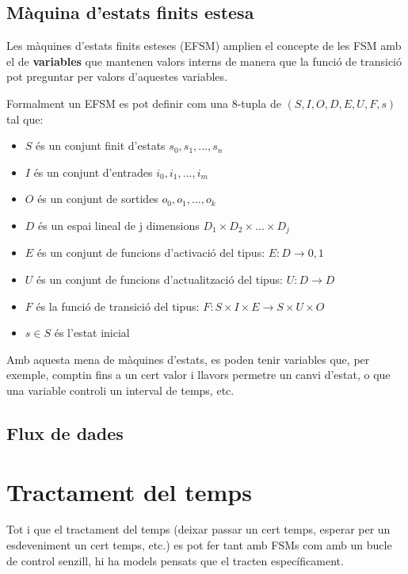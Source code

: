\section{Màquina d'estats finits estesa}
\label{sec:EFSM}

Les màquines d'estats finits esteses (\gls{EFSM}) amplien el concepte de les FSM amb el de {\bf variables} que mantenen valors interns de manera que la funció de transició pot preguntar per valors d'aquestes variables.\cite{wiki:EFSM}

\begin{remark}
 Formalment un EFSM es pot definir com una 8-tupla de $(S, I, O, D, E, U, F, s)$ tal que:
\begin{itemize}
 \item $S$ és un conjunt finit d'estats ${s_0,s_1, ..., s_n}$
 \item $I$ és un conjunt d'entrades ${i_0, i_1, ..., i_m}$
 \item $O$ és un conjunt de sortides ${o_0, o_1, ..., o_k}$
 \item $D$ és un espai lineal de j dimensions $D_1 \times D_2 \times ... \times D_j$
 \item $E$ és un conjunt de funcions d'activació del tipus: $E: D \to {0, 1}$
 \item $U$ és un conjunt  de funcions d'actualització del tipus: $U: D \to D$
 \item $F$ és la funció de transició del tipus: $F: S \times I \times E \to S \times U \times O$
 \item $s \in S$ és l'estat inicial 
\end{itemize}
\end{remark}

Amb aquesta mena de màquines d'estats, es poden tenir variables que, per exemple, comptin fins a un cert valor i llavors permetre un canvi d'estat, o que una variable controli un interval de temps, etc. 

\section{Flux de dades}
\label{sec:dataflow}


\chapter{Tractament del temps}
\label{ch:tractamenttemps}

Tot i que el tractament del temps (deixar passar un cert temps, esperar per un esdeveniment un cert temps, etc.) es pot fer tant amb FSMs com amb un bucle de control senzill, hi ha models pensats que el tracten específicament.


